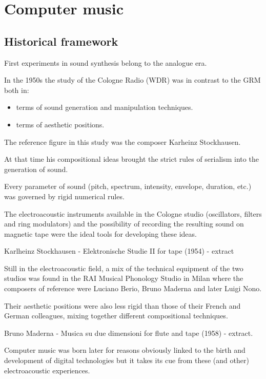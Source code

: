 \chapter{Computer music}

\section{Historical framework}\label{historical-framework}

First experiments in sound synthesis belong to the analogue era.

In the 1950s the study of the Cologne Radio (WDR) was in contrast to the GRM both in:

\begin{itemize}
\tightlist
\item terms of sound generation and manipulation techniques. 
\item terms of aesthetic positions.
\end{itemize}

The reference figure in this study was the composer Karheinz Stockhausen.

At that time his compositional ideas brought the strict rules of serialism into the generation of sound.

Every parameter of sound (pitch, spectrum, intensity, envelope, duration, etc.) was governed by rigid numerical rules.

The electroacoustic instruments available in the Cologne studio (oscillators, filters and ring modulators) and the possibility of recording the resulting sound on magnetic tape were the ideal tools for developing these ideas.

Karlheinz Stockhausen - Elektronische Studie II for tape (1954) - extract

Still in the electroacoustic field, a mix of the technical equipment of the two studios was found in the RAI Musical Phonology Studio in Milan where the composers of reference were Luciano Berio, Bruno Maderna and later Luigi Nono.

Their aesthetic positions were also less rigid than those of their French and German colleagues, mixing together different compositional techniques.

Bruno Maderna - Musica su due dimensioni for flute and tape (1958) - extract.

Computer music was born later for reasons obviously linked to the birth and development of digital technologies but it takes its cue from these (and other) electroacoustic experiences.

